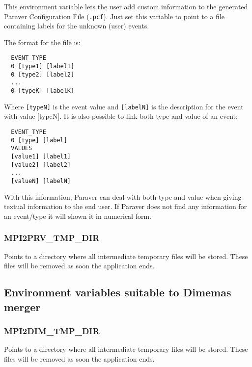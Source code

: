 This environment variable lets the user add custom information to the generated Paraver Configuration File ({\tt .pcf}). Just set this variable to point to a file containing labels for the unknown (user) events.

The format for the file is:

\begin{verbatim}
  EVENT_TYPE
  0 [type1] [label1]
  0 [type2] [label2]
  ...
  0 [typeK] [labelK]
\end{verbatim}

Where {\tt [typeN]} is the event value and {\tt [labelN]} is the description for the event with value [typeN].
It is also possible to link both type and value of an event:

\begin{verbatim}
  EVENT_TYPE
  0 [type] [label]
  VALUES
  [value1] [label1]
  [value2] [label2]
  ...
  [valueN] [labelN]
\end{verbatim}

With this information, Paraver can deal with both type and  value when giving textual information to the end user. If Paraver does not find any information for an event/type it will shown it in numerical form.

\subsubsection{MPI2PRV\_TMP\_DIR}

Points to a directory where all intermediate temporary files will be stored. These files will be removed as soon the application ends.

\subsection{Environment variables suitable to Dimemas merger}

\subsubsection{MPI2DIM\_TMP\_DIR}

Points to a directory where all intermediate temporary files will be stored. These files will be removed as soon the application ends.

